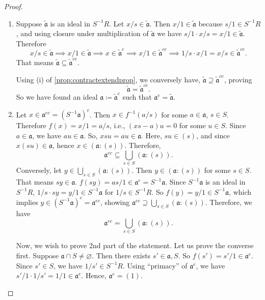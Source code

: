 \begin{proof}
  \begin{enumerate}[label=\roman*)]
    \item Suppose \( \widetilde{\mathfrak{a}} \) is an ideal in \( S^{-1}R \). Let  \( x / s \in \widetilde{\mathfrak{a}} \). Then \( x / 1 \in \widetilde{\mathfrak{a}} \) because \( s / 1 \in S^{-1}R \), and using closure under multiplication of \( \widetilde{\mathfrak{a}} \) we have \( s / 1 \cdot x / s = x / 1 \in \widetilde{\mathfrak{a}} \). Therefore
    \[
      x / s \in \widetilde{\mathfrak{a}} \implies x / 1 \in\widetilde{\mathfrak{a}} \implies x \in \widetilde{\mathfrak{a}}^c \implies x / 1 \in \widetilde{\mathfrak{a}}^{ce} \implies 1 / s \cdot x / 1 = x / s \in \widetilde{\mathfrak{a}}^{ce}.
    \]
    That means \( \widetilde{\mathfrak{a}} \subseteq \widetilde{\mathfrak{a}}^{ce} \).

    Using (i) of \autoref{prop:contractextendprop}, we conversely have, \( \widetilde{\mathfrak{a}} \supseteq \widetilde{\mathfrak{a}}^{ce} \), proving 
    \[
    \widetilde{\mathfrak{a}} = \widetilde{\mathfrak{a}}^{ce}.
  \]
  So we have found an ideal \( \mathfrak{a} \coloneq \widetilde{\mathfrak{a}}^c \) such that \( \mathfrak{a}^e = \widetilde{\mathfrak{a}} \).
\item Let  \( x \in \mathfrak{a}^{ec} = (S^{-1}\mathfrak{a})^c\). Then \( x \in f^{-1}(a / s)\) for some \( a \in \mathfrak{a} \), \( s \in S \). Therefore \( f(x) = x / 1 = a / s \), i.e., \( (xs - a)u = 0 \) for some  \( u \in S \). Since  \( a \in \mathfrak{a} \), we have \( au \in \mathfrak{a} \). So, \( xsu = au \in \mathfrak{a} \). Here, \( su \in (s) \), and since \( x(su) \in \mathfrak{a} \), hence \( x \in (\mathfrak{a}: (s)) \). Therefore,
  \[
    \mathfrak{a}^{ec} \subseteq \bigcup_{s \in S}(\mathfrak{a} : (s)). 
  \]
  Conversely, let \( y \in \bigcup_{s \in S}(\mathfrak{a} : (s)) \). Then \( y \in (\mathfrak{a} : (s)) \) for some \( s \in S \). That means  \( sy \in \mathfrak{a} \). \( f(sy) = a s / 1 \in \mathfrak{a}^e = S^{-1}\mathfrak{a} \). Since \( S^{-1} \mathfrak{a} \) is an ideal in \( S^{-1} R\), \( 1 / s \cdot sy = y / 1 \in S^{-1}\mathfrak{a} \) for \( 1 / s \in S^{-1}R \).  So \( f(y) = y / 1 \in S^{-1}\mathfrak{a} \), which implies \( y \in (S^{-1}\mathfrak{a})^c =  \mathfrak{a}^{ec}\), showing \( \mathfrak{a}^{ec} \supseteq \bigcup_{s \in S}(\mathfrak{a} : (s)) \). Therefore, we have
  \[
    \mathfrak{a}^{ec} = \bigcup_{s \in S}(\mathfrak{a} : (s)).
  \]

  Now, we wish to prove 2nd part of the statement. Let us prove the converse first. Suppose \(  \mathfrak{a} \cap S \neq \varnothing \). Then there exists \( s' \in \mathfrak{a}, S \). So \( f(s') = s' / 1 \in \mathfrak{a}^e \). Since \( s'\in S\), we have \( 1 / s' \in S^{-1}R \). Using ``primacy'' of  \( \mathfrak{a}^e \), we have \( s' / 1 \cdot 1 / s' = 1 / 1 \in \mathfrak{a}^e\). Hence, \( \mathfrak{a}^e = (1) \). 


\end{enumerate}
\end{proof}
